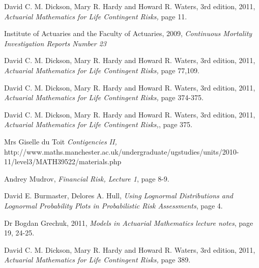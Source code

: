 \documentclass{report}
\begin{document}
\begin{thebibliography}{99}             %

  David C. M. Dickson, Mary R. Hardy and Howard R. Waters,
    3rd edition, 2011, 
    {\em Actuarial Mathematics for Life Contingent Risks,}
    page 11.


 Institute of Actuaries and the Faculty of Actuaries,
2009,
{\em Continuous Mortality Investigation Reports Number 23}


  David C. M. Dickson, Mary R. Hardy and Howard R. Waters,
    3rd edition, 2011, 
    {\em Actuarial Mathematics for Life Contingent Risks,}
    page 77,109.








  David C. M. Dickson, Mary R. Hardy and Howard R. Waters,
    3rd edition, 2011, 
    {\em Actuarial Mathematics for Life Contingent Risks,}
    page 374-375.

  David C. M. Dickson, Mary R. Hardy and Howard R. Waters,
    3rd edition, 2011, 
    {\em Actuarial Mathematics for Life Contingent Risks,},
    page 375.



  Mrs Giselle du Toit
    {\em Contigencies II,}
    http://www.maths.manchester.ac.uk/undergraduate/ugstudies/units/2010-11/level3/MATH39522/materials.php



  Andrey Mudrov,
    {\em Financial Risk, Lecture 1},
    page 8-9.



  David E. Burmaster, Delores A. Hull,
    {\em Using Lognormal Distributions and Lognormal Probability Plots in Probabilistic Risk Assessments},
    page 4.




  Dr Bogdan Grechuk,
    2011,
    {\em Models in Actuarial Mathematics lecture notes},
    page 19, 24-25.


  David C. M. Dickson, Mary R. Hardy and Howard R. Waters,
    3rd edition, 2011, 
    {\em Actuarial Mathematics for Life Contingent Risks,}
    page 389.



\end{thebibliography}
\end{document}

